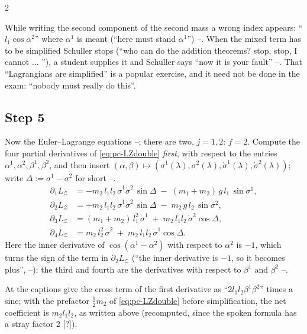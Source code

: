 \begin{paracol}{2}
\begin{coursenote}\label{cn:pc-slips}
While writing the second component of the second mass a wrong index appears: ``$l_1\cos\alpha^2$'' where $\alpha^1$ is meant (``here must stand $\alpha^1$'') --. When the mixed term has to be simplified Schuller stops (``who can do the addition theorems? stop, stop, I cannot ... ''), a student supplies it and Schuller says ``now it is your fault'' --. That ``Lagrangians are simplified'' is a popular exercise, and it need not be done in the exam: ``nobody must really do this''.
\end{coursenote}

\subsection{Step 5}\label{ssec:pc-d5}

Now the Euler--Lagrange equations --; there are two, $j=1,2$: $f=2$. Compute the four partial derivatives of \eqref{eq:pc-LZdouble} \emph{first}, with respect to the entries $\alpha^1,\alpha^2,\beta^1,\beta^2$, and then insert $(\alpha,\beta)\mapsto(\sigma^1(\lambda),\sigma^2(\lambda),\dot\sigma^1(\lambda),\dot\sigma^2(\lambda))$; write $\Delta:=\sigma^1-\sigma^2$ for short --.
\begin{align*}
  \partial_{1}L_{\mathcal Z}&=-m_2\,l_1l_2\,\dot\sigma^1\dot\sigma^2\,\sin\Delta\;-\;(m_1+m_2)\,g\,l_1\,\sin\sigma^1 ,\\
  \partial_{2}L_{\mathcal Z}&=+m_2\,l_1l_2\,\dot\sigma^1\dot\sigma^2\,\sin\Delta\;-\;m_2\,g\,l_2\,\sin\sigma^2 ,\\
  \partial_{3}L_{\mathcal Z}&=(m_1+m_2)\,l_1^2\,\dot\sigma^1\;+\;m_2\,l_1l_2\,\dot\sigma^2\cos\Delta ,\\
  \partial_{4}L_{\mathcal Z}&=m_2\,l_2^2\,\dot\sigma^2\;+\;m_2\,l_1l_2\,\dot\sigma^1\cos\Delta .
\end{align*}
Here the inner derivative of $\cos(\alpha^1-\alpha^2)$ with respect to $\alpha^2$ is $-1$, which turns the sign of the term in $\partial_2L_{\mathcal Z}$ (``the inner derivative is $-1$, so it becomes plus'', --); the third and fourth are the derivatives with respect to $\beta^1$ and $\beta^2$ --.

\begin{coursenote}\label{cn:pc-cross}
At  the captions give the cross term of the first derivative as ``$2l_1l_2\beta^1\beta^2$'' times a sine; with the prefactor $\tfrac12m_2$ of \eqref{eq:pc-LZdouble} before simplification, the net coefficient is $m_2l_1l_2$, as written above (recomputed, since the spoken formula has a stray factor 2 [?]).
\end{coursenote}


\end{paracol}
